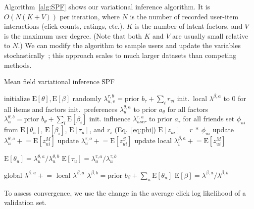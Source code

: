 \documentclass{sig-alternate-2013}
\newcommand{\pluseq}{\mathrel{+}=}
\newcommand{\E}{\mathrm{E}}
\begin{document}
Algorithm~\ref{alg:SPF} shows our variational inference algorithm.  It
is $O(N(K+V))$ per iteration, where $N$ is the number of recorded
user-item interactions (click counts, ratings, etc.). $K$ is the
number of latent factors, and $V$ is the maximum user degree.  (Note
that both $K$ and $V$ are usually small relative to $N$.)  We can modify
the algorithm to sample users and update the variables
stochastically~\cite{Hoffman:2013}; this approach scales to much
larger datasets than competing methods.

\begin{algorithm}[h]
\small
\caption{Mean field variational inference SPF}
\label{alg:SPF}
\begin{algorithmic}[1]
\State initialize $\E[\theta], \E[\beta]$ randomly
		\State $\lambda^{\tau,b}_{u,v} =  \mbox{prior~} b_{\tau} + \sum_i r_{vi}$
	\EndFor
\EndFor
{}
			\State init.~local $\lambda^{\beta,a}$ to 0 for all items and factors
			\State init.~preferences $\lambda^{\theta,a}_{u}$ to prior $a_\theta$ for all factors
			\State $\lambda^{\theta,b}_{u} =  \mbox{prior~} b_{\theta} + \sum_i \E[\beta_i]$
			\State init. influence $\lambda^{\tau,a}_{user}$ to prior $a_\tau$ for all friends
				\State set $\phi_{ui}$ from $\E[\theta_{u}]$, $\E[\beta_{i}]$,
				$\E[\tau_{u}]$, and $r_i$ (Eq.~\ref{eq:phi})
				\State $\E[z_{ui}] = r~*~\phi_{ui} $
				\State update $\lambda^{\theta,a}_{u} \pluseq \E[z_{ui}^M]$  
				\State update $\lambda^{\tau,a}_{u} \pluseq \E[z_{ui}^S]$  
				\State update local $\lambda^{\beta,a}_{i} \pluseq \E[z_{ui}^M]$  
			\EndFor

			\State $\E[\theta_{u}] = \lambda^{\theta,a}_{u} / \lambda^{\theta,b}_{u}$
			\State $\E[\tau_{u}] = \lambda^{\tau,a}_{u} / \lambda^{\tau,b}_{u}$

		\EndWhile

		\State global $\lambda^{\beta,a} \pluseq $ local $\lambda^{\beta,a}$
	\EndFor
	\State $\lambda^{\beta,b} = \mbox{prior~} b_{\beta} + \sum_u \E[\theta_u]$
	\State $\E[\beta] = \lambda^{\beta,a} / \lambda^{\beta,b}$
\EndWhile
\end{algorithmic}
\end{algorithm}

To assess convergence, we use the change in the average click log likelihood of a validation set.

\balancecolumns
\end{document}

